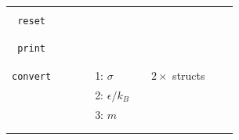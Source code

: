 \documentclass[11pt]{article}
\begin{document}
\begin{center}
\begin{tabular}{cclclclll}
    \hline
                                   && && && \\
    \verb!reset! & & && && \\
                                   && && && \\
    \hline
                                   && && && \\
   \verb!print! & & && && \\
                                   && && && \\
    \hline
                                && && && \\
    \verb!convert! && && 1: $\sigma$ && $2\times$ structs \\
    $\mbox{}$  && && 2: $\epsilon/k_B$ && \\
    $\mbox{}$  && && 3: $m$ && \\
                                   && && && \\
    \hline
                                   && && && \\
  \end{tabular}

\end{center}
\end{document}
